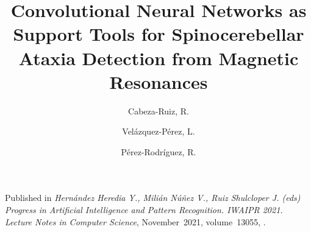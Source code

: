 \author
{
    Cabeza-Ruiz, R.
    \and
    Velázquez-Pérez, L.
    \and
    Pérez-Rodríguez, R.
}
\title{Convolutional Neural Networks as Support Tools for Spinocerebellar Ataxia Detection from Magnetic Resonances}
\metadata
{
    Published in \emph{Hernández Heredia Y., Milián Núñez V., Ruiz Shulcloper J. (eds) Progress in Artificial Intelligence and Pattern Recognition. IWAIPR 2021. Lecture Notes in Computer Science},
    November~2021,
    volume~13055,
    .
}
\maketitle
\label{pap:first}
